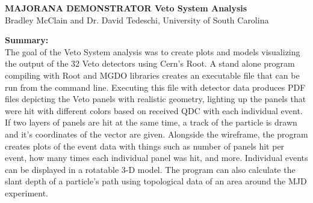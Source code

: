 \documentclass[a4paper,12pt]{article}
\begin{document}
\begin{center}
\textbf{MAJORANA DEMONSTRATOR Veto System Analysis}
\fontsize{10}{12}\selectfont \\
\bigskip
Bradley McClain and Dr. David Tedeschi, University of South Carolina
\end{center}
\pagebreak

\textbf{Summary:} \\
The goal of the Veto System analysis was to create plots and models visualizing the output of the 32 Veto detectors using Cern's Root. A stand alone program compiling with Root and MGDO libraries creates an executable file that can be run from the command line. Executing this file with detector data produces PDF files depicting the Veto panels with realistic geometry, lighting up the panels that were hit with different colors based on received QDC with each individual event. If two layers of panels are hit at the same time, a track of the particle is drawn and it's coordinates of the vector are given. Alongside the wireframe, the program creates plots of the event data with things such as number of panels hit per event, how many times each individual panel was hit, and more. Individual events can be displayed in a rotatable 3-D model. The program can also calculate the slant depth of a particle's path using topological data of an area around the MJD experiment.

\begin{figure}[h]
\centering
{}%
\end{figure}

\pagebreak
\end{document}
